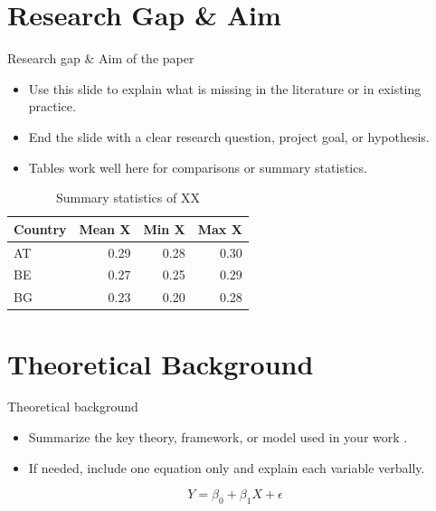 \documentclass[t]{beamer}
\begin{document}
\section{Research Gap \& Aim}
\begin{frame}{Research gap \& Aim of the paper}
    \begin{itemize}
        \item Use this slide to explain what is missing in the literature or in existing practice.
        \item End the slide with a clear research question, project goal, or hypothesis.
        \item Tables work well here for comparisons or summary statistics.
    \end{itemize}

    \begin{table}[h!]
        \centering
        \caption{Summary statistics of XX}
        \label{tab:summary}
        \begin{tabular}{lrrr}
            \toprule
            Country & Mean X & Min X & Max X \\
            \midrule
            AT & 0.29 & 0.28 & 0.30 \\
            BE & 0.27 & 0.25 & 0.29 \\
            BG & 0.23 & 0.20 & 0.28 \\
            \bottomrule
        \end{tabular}
    \end{table}
\end{frame}

\section{Theoretical Background}
\begin{frame}{Theoretical background}
    \begin{itemize}
        \item Summarize the key theory, framework, or model used in your work \citep{NIPS2017_3f5ee243}.
        \item If needed, include one equation only and explain each variable verbally.
    \end{itemize}

    \begin{equation}
        Y = \beta_0 + \beta_1 X + \epsilon
    \end{equation}
\end{frame}
\end{document}
